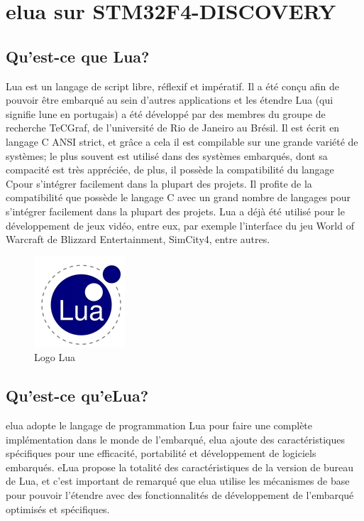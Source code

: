 \chapter[elua sur STM32F4-DISCOVERY]{elua sur STM32F4-DISCOVERY}
\label{chap:chap3}

\section{Qu'est-ce que Lua?}

Lua est un langage de script libre, réflexif et impératif. Il a été conçu afin de pouvoir être embarqué au sein d'autres applications et les étendre
Lua (qui signifie lune en portugais) a été développé par des membres du groupe de recherche TeCGraf, de l'université de Rio de Janeiro au Brésil.
Il est écrit en langage C ANSI strict, et grâce a cela il est compilable sur une grande variété de systèmes; le plus souvent est utilisé dans des systèmes 
embarqués, dont sa compacité est très appréciée, de plus, il possède la compatibilité du langage Cpour s'intégrer facilement dans la plupart des projets.
Il profite de la compatibilité que possède le langage C avec un grand nombre de langages pour s'intégrer facilement dans la plupart des projets. Lua a déjà
été utilisé pour le développement de jeux vidéo, entre eux, par exemple l'interface du jeu World of Warcraft de Blizzard Entertainment, SimCity4, entre 
autres.

\begin{figure}[h]
\begin{center}
\includegraphics[scale=0.4]{figure/eLua/Lua.JPG}
\caption{Logo Lua}
\end{center}
\end{figure}


\section{Qu'est-ce qu'eLua?}

  elua adopte le langage de programmation Lua pour faire une complète implémentation dans le monde de l'embarqué, elua ajoute des caractéristiques
spécifiques pour une efficacité, portabilité et développement de logiciels embarqués. eLua propose la totalité des caractéristiques de la version
de bureau de Lua, et c'est important de remarqué que elua utilise les mécanismes de base pour pouvoir l'étendre avec des fonctionnalités de développement 
de l'embarqué optimisés et spécifiques.
 

